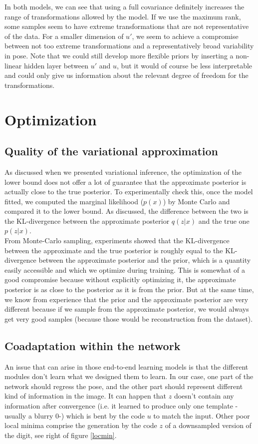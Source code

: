 \documentclass[letterpaper, twoside]{article}
\begin{document}
  In both models, we can see that using a full covariance definitely increases the range of transformations allowed by the model. If we use the maximum rank, some samples seem to have extreme transformations that are not representative of the data. For a smaller dimension of $u'$, we seem to achieve a compromise between not too extreme transformations and a representatively broad variability in pose. Note that we could still develop more flexible priors by inserting a non-linear hidden layer between $u'$ and $u$, but it would of course be less interpretable and could only give us information about the relevant degree of freedom for the transformations.

\section{Optimization}
\subsection{Quality of the variational approximation}
  As discussed when we presented variational inference, the optimization of the lower bound does not offer a lot of guarantee that the approximate posterior is actually close to the true posterior. To experimentally check this, once the model fitted, we computed the marginal likelihood ($p(x)$) by Monte Carlo and compared it to the lower bound. As discussed, the difference between the two is the KL-divergence between the approximate posterior $q(z|x)$ and the true one $p(z|x)$.\\

  From Monte-Carlo sampling, experiments showed that the KL-divergence between the approximate and the true posterior is roughly equal to the KL-divergence between the approximate posterior and the prior, which is a quantity easily accessible and which we optimize during training. This is somewhat of a good compromise because without explicitly optimizing it, the approximate posterior is as close to the posterior as it is from the prior. But at the same time, we know from experience that the prior and the approximate posterior are very different because if we sample from the approximate posterior, we would always get very good samples (because those would be reconstruction from the dataset).


\subsection{Coadaptation within the network}
  An issue that can arise in those end-to-end learning models is that the different modules don't learn what we designed them to learn. In our case, one part of the network should regress the pose, and the other part should represent different kind of information in the image. It can happen that $z$ doesn't contain any information after convergence (i.e. it learned to produce only one template -usually a blurry 0-) which is bent by the code $u$ to match the input. Other poor local minima comprise the generation by the code $z$ of a downsampled version of the digit, see right of figure \ref{locmin}.
\end{document}
